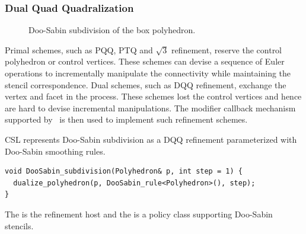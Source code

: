 \subsubsection{Dual Quad Quadralization}

\begin{figure}[htb]
    \caption{Doo-Sabin subdivision of the box polyhedron.}
    \label{fig:ds}
\end{figure}

Primal schemes, such as PQQ, PTQ and $\sqrt{3}$ refinement,
reserve the control polyhedron or control vertices.
These schemes can devise a sequence of Euler operations
to incrementally manipulate the connectivity while 
maintaining the stencil correspondence.
Dual schemes, such as DQQ refinement, exchange the 
vertex and facet in the process. These schemes lost
the control vertices and hence are hard to 
devise incremental manipulations. The modifier callback 
mechanism supported by \cgalpoly\ is then used to 
implement such refinement schemes.

CSL represents Doo-Sabin subdivision as a DQQ refinement 
parameterized with Doo-Sabin smoothing rules.
\begin{lstlisting}
void DooSabin_subdivision(Polyhedron& p, int step = 1) {
  dualize_polyhedron(p, DooSabin_rule<Polyhedron>(), step);
}
\end{lstlisting}
The  is the refinement host and the
 is a policy class supporting 
Doo-Sabin stencils.
\\

